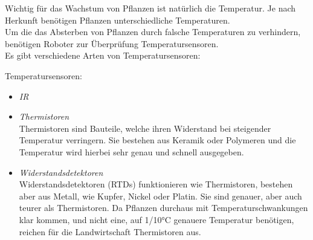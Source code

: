 Wichtig für das Wachstum von Pflanzen ist natürlich die Temperatur. Je nach Herkunft benötigen Pflanzen unterschiedliche Temperaturen.\\
Um die das Absterben von Pflanzen durch falsche Temperaturen zu verhindern, benötigen Roboter zur Überprüfung Temperatursensoren.\\
Es gibt verschiedene Arten von Temperatursensoren:

\begin{description}
	\item {Temperatursensoren:}
	\begin{itemize}
		\item {\textit{IR}}
		
		\item {\textit{Thermistoren}}\\
		Thermistoren sind Bauteile, welche ihren Widerstand bei steigender Temperatur verringern. Sie bestehen aus Keramik oder Polymeren und die Temperatur wird hierbei sehr genau und schnell ausgegeben.
		\item {\textit{Widerstandsdetektoren}}\\
		Widerstandsdetektoren (RTDs) funktionieren wie Thermistoren, bestehen aber aus Metall, wie Kupfer, Nickel oder Platin. Sie sind genauer, aber auch teurer als Thermistoren. Da Pflanzen durchaus mit Temperaturschwankungen klar kommen, und nicht eine, auf 1/10°C genauere Temperatur benötigen, reichen für die Landwirtschaft Thermistoren aus.
	\end{itemize}
\end{description}

